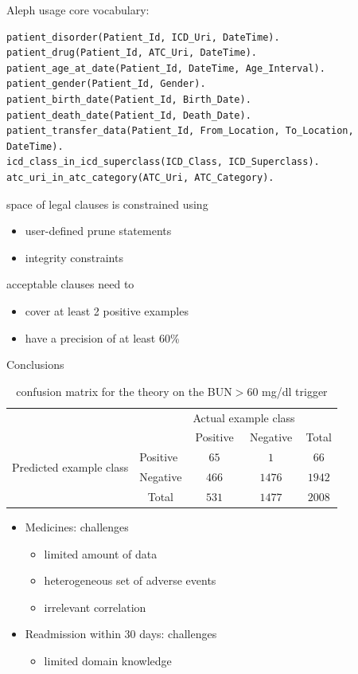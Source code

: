 \documentclass{beamer}
\begin{document}
\begin{frame}[fragile]{Aleph usage}
core vocabulary:
{\tiny
\begin{verbatim}
patient_disorder(Patient_Id, ICD_Uri, DateTime).
patient_drug(Patient_Id, ATC_Uri, DateTime).
patient_age_at_date(Patient_Id, DateTime, Age_Interval).
patient_gender(Patient_Id, Gender).
patient_birth_date(Patient_Id, Birth_Date).
patient_death_date(Patient_Id, Death_Date).
patient_transfer_data(Patient_Id, From_Location, To_Location, DateTime).
icd_class_in_icd_superclass(ICD_Class, ICD_Superclass).
atc_uri_in_atc_category(ATC_Uri, ATC_Category).
\end{verbatim}
}
space of legal clauses is constrained using 
\begin{itemize}
\item user-defined prune statements
\item integrity constraints
\end{itemize}
acceptable clauses need to
\begin{itemize}
  \item cover at least 2 positive examples
  \item have a precision of at least 60\%
\end{itemize}
\end{frame}

\begin{frame}{Conclusions}
\begin{table}
  \begin{tabular}{l|l|c|c|c}
    \multicolumn{2}{c}{}&\multicolumn{2}{c}{Actual example class}&\\
    \cline{3-4}
    \multicolumn{2}{c|}{}&Positive&Negative&\multicolumn{1}{c}{Total}\\
    \cline{2-4}
    \multirow{2}{*}{Predicted example class}& Positive & $65$ & $1$ & $66$\\
    \cline{2-4}
    & Negative & $466$ & $1476$ & $1942$\\
    \cline{2-4}
    \multicolumn{1}{c}{} & \multicolumn{1}{c}{Total} & \multicolumn{1}{c}{$531$} & \multicolumn{1}{c}{$1477$} & \multicolumn{1}{c}{$2008$}\\
  \end{tabular}
  \caption {confusion matrix for the theory on the BUN$>$60 mg/dl trigger}
  \label{confusion-matrix-bun}
\end{table}
\pause
\begin{itemize}
\item Medicines: challenges \pause
  \begin{itemize}
  \item limited amount of data
  \item heterogeneous set of adverse events
  \item irrelevant correlation \pause
  \end{itemize}
\item Readmission within 30 days: challenges \pause
  \begin{itemize}
  \item limited domain knowledge
  \end{itemize}
\end{itemize}
\end{frame}
\end{document}

